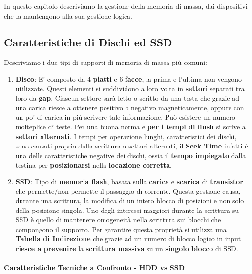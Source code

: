 \documentclass{article}
\begin{document}
In questo capitolo descriviamo la gestione della memoria di massa, dai dispositivi che la mantengono alla sua gestione logica.

\subsection{Caratteristiche di Dischi ed SSD}

Descriviamo i due tipi di supporti di memoria di massa più comuni:

\begin{enumerate}
    \item \textbf{Disco}: E' composto da $4$ \textbf{piatti} e $6$ \textbf{facce}, la prima e l'ultima non vengono utilizzate. Questi elementi si suddividono a loro volta in
    \textbf{settori} separati tra loro da \textbf{gap}. Ciascun settore sarà letto o scritto da una testa che grazie ad una carica riesce a ottenere positivo o negativo magneticamente, oppure con un po' di carica
    in più scrivere tale informazione. Può esistere un numero molteplice di teste. Per una buona norma e \textbf{per i tempi di flush} si scrive a \textbf{settori alternati}. I tempi per operazione lunghi, caratteristici dei dischi, sono causati proprio dalla scrittura a settori alternati, il \textbf{Seek Time} infatti è una delle caratteristiche negative dei dischi, ossia il \textbf{tempo impiegato} dalla testina per \textbf{posizionarsi} nella \textbf{locazione corretta}.
    \item \textbf{SSD}: Tipo di \textbf{memoria flash}, basata sulla \textbf{carica} e \textbf{scarica} di \textbf{transistor} che permette/non permette il passaggio di corrente. Questa gestione causa, durante una scrittura, la modifica di un intero blocco di posizioni e non solo della posizione singola. Uno degli interessi maggiori durante la scrittura su SSD è quello di mantenere omogeneità nella scrittura sui blocchi che compongono il supporto. Per garantire questa proprietà si utilizza una \textbf{Tabella di Indirezione} che grazie ad un numero di blocco logico in input \textbf{riesce a prevenire} la \textbf{scrittura massiva} su un \textbf{singolo blocco} di SSD.
\end{enumerate}

\paragraph{Caratteristiche Tecniche a Confronto - HDD vs SSD}
\end{document}
